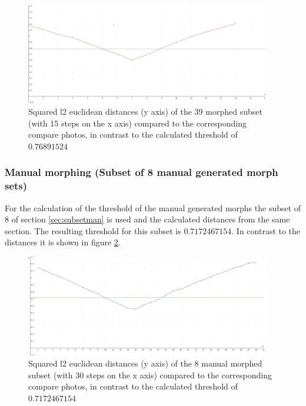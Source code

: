 \begin{figure}[htbp] 
	\centering
		\includegraphics[width=0.95\textwidth]{Resources/result39-90-10.jpg}
	\caption{Squared l2 euclidean distances (y axis) of the 39 morphed subset (with 15 steps on the x axis) compared to the corresponding compare photos, in contrast to the calculated threshold of $0.76891524$} %
	\label{fig:Result39-90-10}
\end{figure}

\subsubsection{Manual morphing (Subset of 8 manual generated morph sets)}\label{sec:manmorph-thres}
For the calculation of the threshold of the manual generated morphs the subset of 8 of section \ref{sec:subsetman} is used and the calculated distances from the same section.
The resulting threshold for this subset is \textbf{$0.7172467154$}. In contrast to the distances it is shown in figure \ref{fig:Resultman-90-10}.


\begin{figure}[htbp] 
	\centering
		\includegraphics[width=0.95\textwidth]{Resources/result-jannis-mean-90-10.jpg}
	\caption{Squared l2 euclidean distances (y axis) of the 8 manual morphed subset (with 30 steps on the x axis) compared to the corresponding compare photos, in contrast to the calculated threshold of $0.7172467154$} %
	\label{fig:Resultman-90-10}
\end{figure}

